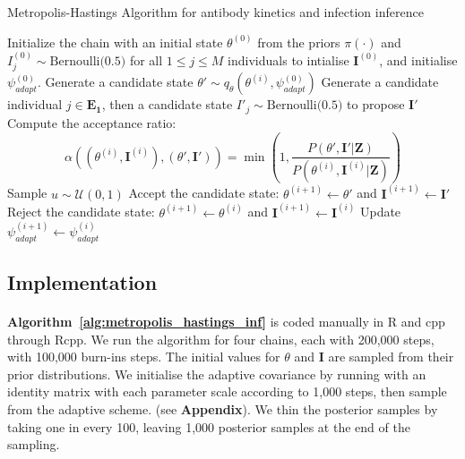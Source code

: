 \begin{algorithm}[H]
\caption{Metropolis-Hastings Algorithm for antibody kinetics and infection inference}
\label{alg:metropolis_hastings_inf}
\begin{algorithmic}[1]
    \State Initialize the chain with an initial state $\theta^{(0)}$ from the priors $\pi(\cdot)$ and $I^{(0)}_{j} \sim \text{Bernoulli(0.5)}$ for all $1 \leq j \leq M$ individuals to intialise $\mathbf{I}^{(0)}$, and initialise $\psi^{(0)}_{adapt}$.
        \State Generate a candidate state $\theta' \sim q_\theta\left(\theta^{(i)}, \psi^{(0)}_{adapt}\right)$
        \State Generate a candidate individual $j \in \mathbf{E_1} $, then a candidate state $I'_j \sim \text{Bernoulli(0.5)}$ to propose $\mathbf{I}'$
        \State Compute the acceptance ratio:
        \[
        \alpha((\theta^{(i)}, \mathbf{I}^{(i)}),( \theta',  \mathbf{I}')) = \min\left(1, \frac{P(\theta', \mathbf{I}'|\mathbf{Z})}{P(\theta^{(i)}, \mathbf{I}^{(i)}|\mathbf{Z})} \right)
        \]
        \State Sample $u \sim \mathcal{U}(0, 1)$
            \State Accept the candidate state: $\theta^{(i+1)} \leftarrow \theta'$ and $\mathbf{I}^{(i + 1)}  \leftarrow \mathbf{I}'$
        \Else
            \State Reject the candidate state: $\theta^{(i+1)} \leftarrow \theta^{(i)}$ and $\mathbf{I}^{(i + 1)}  \leftarrow \mathbf{I}^{(i)} $
        \EndIf 
        \State Update $ \psi^{(i + 1)}_{adapt} \leftarrow \psi^{(i)}_{adapt}$
    \EndFor
\end{algorithmic} 
\end{algorithm}


\subsection{Implementation }
\paragraph{}  \textbf{Algorithm~\ref{alg:metropolis_hastings_inf}} is coded manually in R and cpp through Rcpp. We run the algorithm for four chains, each with 200,000 steps, with 100,000 burn-ins steps. The initial values for $\theta$ and $\mathbf{I}$ are sampled from their prior distributions. We initialise the adaptive covariance by running with an identity matrix with each parameter scale according to 1,000 steps, then sample from the adaptive scheme. (see \textbf{Appendix}). We thin the posterior samples by taking one in every 100, leaving 1,000 posterior samples at the end of the sampling.


